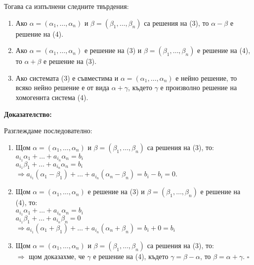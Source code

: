 \documentclass[fleqn,12pt]{article}
\begin{document}
\begin{flushleft}
Тогава са изпълнени следните твърдения:

\begin{enumerate}
    \item Ако $\alpha = (\alpha_1, \dots, \alpha_n)$ и $\beta = (\beta_1, \dots, \beta_n)$ са решения на (3), то $\alpha - \beta$ е решение на (4).
    \item Ако $\alpha = (\alpha_1, \dots, \alpha_n)$ е решение на (3) и $\beta = (\beta_1, \dots, \beta_n)$ е решение на (4), то $\alpha + \beta$ е решение на (3).
    \item Ако системата (3) е съвместима и $\alpha = (\alpha_1, \dots, \alpha_n)$ е нейно решение, то всяко нейно решение е от вида $\alpha + \gamma$, където $\gamma$ е произволно решение на хомогеннта система (4).
\end{enumerate}

\textbf{Доказателство:}

Разглеждаме последователно:

\begin{enumerate}
    \item Щом $\alpha = (\alpha_1, \dots, \alpha_n)$ и $\beta = (\beta_1, \dots, \beta_n)$ са решения на (3), то:\\
    $a_{i_1} \alpha_1 + \dots + a_{i_n} \alpha_n = b_i$ \\
    $a_{i_1} \beta_1 + \dots + a_{i_n} \alpha_n = b_i$ \\
    $\Rightarrow a_{i_1} (\alpha_1 - \beta_1) + \dots + a_{i_n} (\alpha_n - \beta_n) = b_i - b_i = 0$.
    \item Щом $\alpha = (\alpha_1, \dots, \alpha_n)$ е решение на (3) и $\beta = (\beta_1, \dots, \beta_n)$ е решение на (4), то: \\
    $a_{i_1} \alpha_1 + \dots + a_{i_n} \alpha_n = b_i$ \\
    $a_{i_1} \beta_1 + \dots + a_{i_n} \beta_n = 0$ \\
    $\Rightarrow a_{i_1} (\alpha_1 + \beta_1) + \dots + a_{i_n} (\alpha_n + \beta_n) = b_i + 0 = b_i $
    \item Щом $\alpha = (\alpha_1, \dots, \alpha_n)$ и $\beta = (\beta_1, \dots, \beta_n)$ са решения на (3), то: \\
    $\Rightarrow$ щом доказахме, че $\gamma$ е решение на (4), където $\gamma = \beta - \alpha$, то $\beta = \alpha + \gamma$. $\square$
\end{enumerate}

\end{flushleft}
\end{document}
